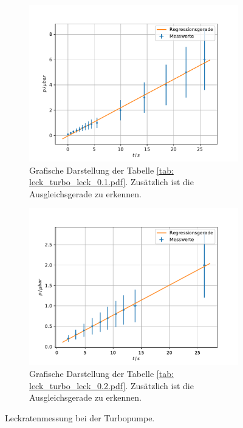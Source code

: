 \begin{figure}[h]
    \centering
    \begin{subfigure}{0.4\textwidth}
        \centering
        \includegraphics[width=1\textwidth]{../Messdaten/plots/turbo/leckrate_turbo_01.pdf}
        \caption{Grafische Darstellung der Tabelle \ref{tab: leck_turbo_leck_0.1.pdf}. Zusätzlich ist die Ausgleichsgerade zu erkennen.}
        \label{fig: drehs_turbo_1_1}
    \end{subfigure}
    \begin{subfigure}{0.4\textwidth}
        \centering
        \includegraphics[width=1\textwidth]{../Messdaten/plots/turbo/leckrate_turbo_02.pdf}
        \caption{Grafische Darstellung der Tabelle \ref{tab: leck_turbo_leck_0.2.pdf}. Zusätzlich ist die Ausgleichsgerade zu erkennen.}
    \end{subfigure}
    \caption{Leckratenmessung bei der Turbopumpe.}
      \label{fig: leck_turbo_1_2}
\end{figure}

